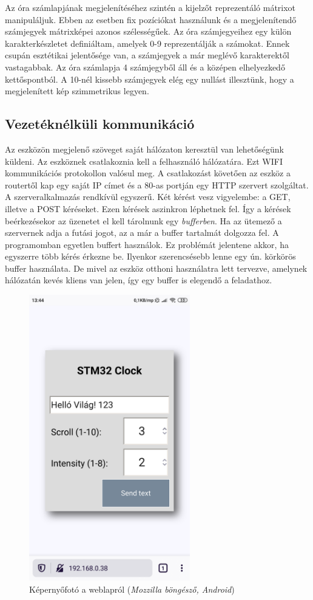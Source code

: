 \documentclass[a4paper, 12pt]{article}
\begin{document}
Az óra számlapjának megjelenítéséhez szintén a kijelzőt reprezentáló mátrixot manipuláljuk.
Ebben az esetben fix pozíciókat használunk és a megjelenítendő számjegyek mátrixképei azonos szélességűek.
Az óra számjegyeihez egy külön karakterkészletet definiáltam, amelyek 0-9 reprezentálják a számokat. Ennek csupán esztétikai jelentősége van, a számjegyek a már meglévő karakterektől vastagabbak.
Az óra számlapja 4 számjegyből áll és a középen elhelyezkedő kettőspontból.
A 10-nél kissebb számjegyek elég egy nullást illesztünk, hogy a megjelenített kép szimmetrikus legyen.

\subsection{Vezetéknélküli kommunikáció}
Az eszközön megjelenő szöveget saját hálózaton keresztül van lehetőségünk küldeni. Az eszköznek csatlakoznia kell a felhasználó hálózatára. Ezt WIFI kommunikációs protokollon valósul meg. A csatlakozást követően az eszköz a routertől kap egy saját IP címet és a 80-as portján egy HTTP szervert szolgáltat.
A szerveralkalmazás rendkívül egyszerű. Két kérést vesz vigyelembe: a GET, illetve a POST kéréseket.
Ezen kérések aszinkron léphetnek fel. Így a kérések beérkezésekor az üzenetet el kell tárolnunk egy \textit{bufferben}. Ha az ütemező a szervernek adja a futási jogot, az a már a buffer tartalmát dolgozza fel.
A programomban egyetlen buffert használok. Ez problémát jelentene akkor, ha egyszerre több kérés érkezne be. Ilyenkor szerencsésebb lenne egy ún. körkörös buffer használata. De mivel az eszköz otthoni használatra lett tervezve, amelynek hálózatán kevés kliens van jelen, így egy buffer is elegendő a feladathoz.

\begin{figure}[ht]
	\centering
	\includegraphics[width = 7cm]{images/webpage.png}
	\caption{Képernyőfotó a weblapról (\textit{Mozzilla böngésző, Android})}
	\label{fig:webpage}
\end{figure}	
\end{document}

